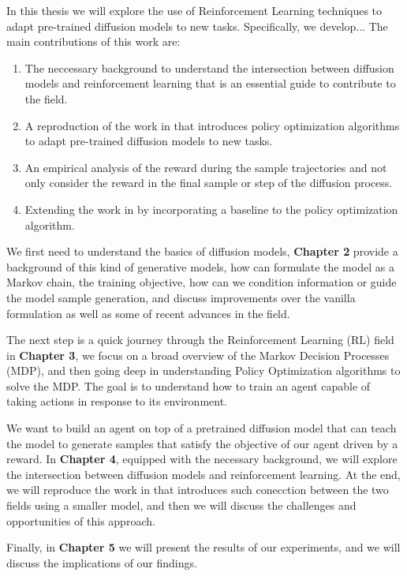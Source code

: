 In this thesis we will explore the use of Reinforcement Learning techniques to adapt pre-trained diffusion models to new tasks. Specifically, we develop... The main contributions of this work are:

\begin{enumerate}
    \item The neccessary background to understand the intersection between diffusion models and reinforcement learning that is an essential guide to contribute to the field.
    \item A reproduction of the work in \cite{black2023training} that introduces policy optimization algorithms to adapt pre-trained diffusion models to new tasks.
    \item An empirical analysis of the reward during the sample trajectories and not only consider the reward in the final sample or step of the diffusion process.
    \item Extending the work in \cite{black2023training} by incorporating a baseline to the policy optimization algorithm.
\end{enumerate}

We first need to understand the basics of diffusion models, \textbf{Chapter 2} provide a background of this kind of generative models, how can formulate the model as a Markov chain, the training objective, how can we condition information or guide the model sample generation, and discuss improvements over the vanilla formulation as well as some of recent advances in the field. 

The next step is a quick journey through the Reinforcement Learning (RL) field in \textbf{Chapter 3}, we focus on a broad overview of the Markov Decision Processes (MDP), and then going deep in understanding Policy Optimization algorithms to solve the MDP. The goal is to understand how to train an agent capable of taking actions in response to its environment. 

We want to build an agent on top of a pretrained diffusion model that can teach the model to generate samples that satisfy the objective of our agent driven by a reward. In \textbf{Chapter 4}, equipped with the necessary background, we will explore the intersection between diffusion models and reinforcement learning. At the end, we will reproduce the work in \cite{black2023training} that introduces such conecction between the two fields using a smaller model, and then we will discuss the challenges and opportunities of this approach. 

Finally, in \textbf{Chapter 5} we will present the results of our experiments, and we will discuss the implications of our findings.